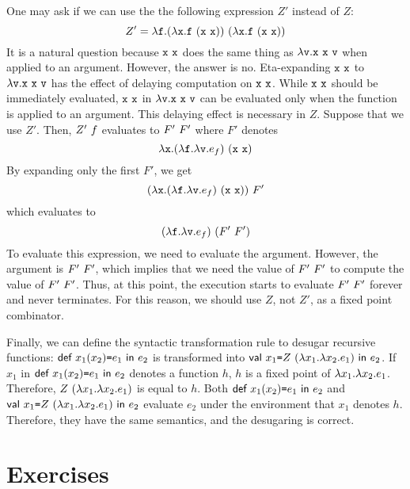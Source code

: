 One may ask if we can use the the following expression $Z'$ instead of $Z$:
\[
  Z'=\efun{\cf}{\eapp
    {(\efun{\cx}{\eapp{\cf}{(\eapp{\cx}{\cx})}})}
    {(\efun{\cx}{\eapp{\cf}{(\eapp{\cx}{\cx})}})}
  }
\]
It is a natural question because $\texttt{x}\ \texttt{x}$ does the same thing as
$\lambda\texttt{v}.\texttt{x}\ \texttt{x}\ \texttt{v}$ when applied to an argument. However,
the answer is no. Eta-expanding $\texttt{x}\ \texttt{x}$ to $\lambda\texttt{v}.\texttt{x}\ \texttt{x}\ \texttt{v}$
has the effect of delaying computation on $\texttt{x}\ \texttt{x}$. While
$\texttt{x}\ \texttt{x}$ should be immediately evaluated, $\texttt{x}\ \texttt{x}$ in
$\lambda\texttt{v}.\texttt{x}\ \texttt{x}\ \texttt{v}$ can be evaluated only when the
function is applied to
an argument. This delaying effect is necessary in $Z$. Suppose that we use $Z'$.
Then, $Z'\ f$ evaluates to $F'\ F'$
where $F'$ denotes
\[
  \lambda\texttt{x}.(\lambda\texttt{f}.\lambda\texttt{v}.e_f)\ (\texttt{x}\ \texttt{x})
\]
By expanding only the first $F'$, we get
\[
  (\lambda\texttt{x}.(\lambda\texttt{f}.\lambda\texttt{v}.e_f)\ (\texttt{x}\ \texttt{x}))\ F'
\]
which evaluates to
\[
  (\lambda\texttt{f}.\lambda\texttt{v}.e_f)\ (F'\ F')
\]
To evaluate this expression, we need to evaluate the argument. However, the
argument is $F'\ F'$, which implies that we need the value of
$F'\ F'$ to compute the value of $F'\ F'$. Thus, at this point,
the execution starts to evaluate $F'\ F'$ forever and never terminates.
For this reason, we should use $Z$, not $Z'$, as a fixed point combinator.

Finally, we can define the syntactic transformation rule to desugar recursive
functions: $\textsf{def}\ x_1(x_2)\texttt{=} e_1\ \textsf{in}\ e_2$ is transformed into
$\textsf{val}\ x_1\texttt{=}Z\ (\lambda x_1.\lambda x_2.e_1)\ \textsf{in}\ e_2$.
If $x_1$ in $\textsf{def}\ x_1(x_2)\texttt{=} e_1\ \textsf{in}\ e_2$ denotes a function $h$, $h$ is a fixed
point of $\lambda x_1.\lambda x_2.e_1$. Therefore,
$Z\ (\lambda x_1.\lambda x_2.e_1)$ is equal to $h$.
Both $\textsf{def}\ x_1(x_2)\texttt{=} e_1\ \textsf{in}\ e_2$ and $\textsf{val}\ x_1\texttt{=}Z\ (\lambda x_1.\lambda x_2.e_1)\ \textsf{in}\ e_2$
evaluate $e_2$ under the environment that $x_1$ denotes $h$. Therefore, they
have the same semantics, and the desugaring is correct.

\section{Exercises}

